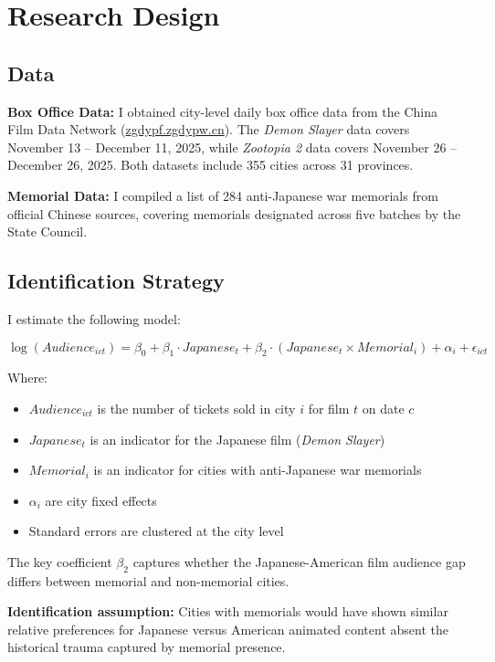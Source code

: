 \documentclass[12pt]{article}
\begin{document}
\section{Research Design}

\subsection{Data}

\textbf{Box Office Data:} I obtained city-level daily box office data from the China Film Data Network (\url{zgdypf.zgdypw.cn}). The \textit{Demon Slayer} data covers November 13 -- December 11, 2025, while \textit{Zootopia 2} data covers November 26 -- December 26, 2025. Both datasets include 355 cities across 31 provinces.

\textbf{Memorial Data:} I compiled a list of 284 anti-Japanese war memorials from official Chinese sources, covering memorials designated across five batches by the State Council.

\subsection{Identification Strategy}

I estimate the following model:

\begin{equation}
\log(Audience_{ict}) = \beta_0 + \beta_1 \cdot Japanese_t + \beta_2 \cdot (Japanese_t \times Memorial_i) + \alpha_i + \epsilon_{ict}
\end{equation}

Where:
\begin{itemize}
\item $Audience_{ict}$ is the number of tickets sold in city $i$ for film $t$ on date $c$
\item $Japanese_t$ is an indicator for the Japanese film (\textit{Demon Slayer})
\item $Memorial_i$ is an indicator for cities with anti-Japanese war memorials
\item $\alpha_i$ are city fixed effects
\item Standard errors are clustered at the city level
\end{itemize}

The key coefficient $\beta_2$ captures whether the Japanese-American film audience gap differs between memorial and non-memorial cities.

\textbf{Identification assumption:} Cities with memorials would have shown similar relative preferences for Japanese versus American animated content absent the historical trauma captured by memorial presence.
\end{document}
